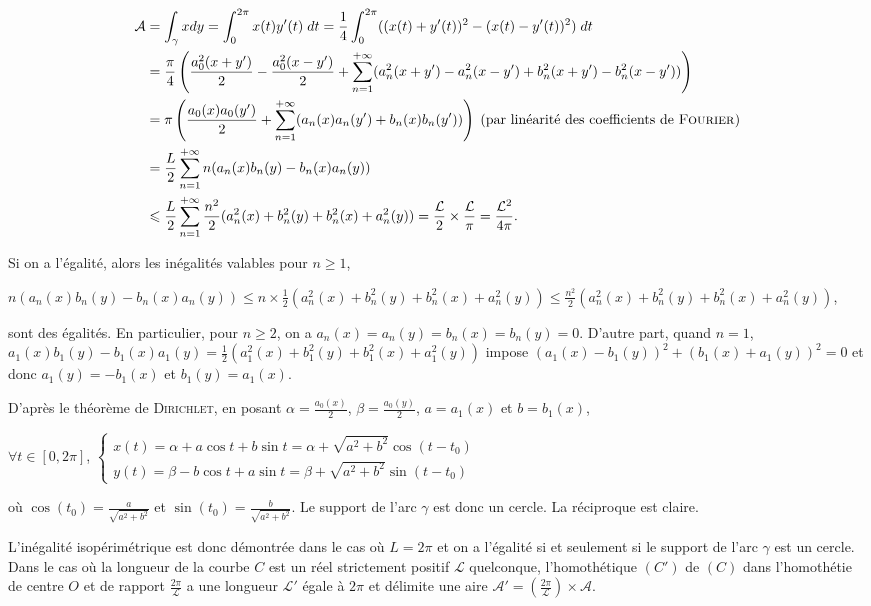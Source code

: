 {{\begin{align*}\ensuremath
\mathcal{A}&=\int_{\gamma}^{}xdy=\int_{0}^{2\pi}x(t)y'(t)\;dt= \frac{1}{4}\int_{0}^{2\pi}((x(t)+y'(t))^2-(x(t)-y'(t))^2)\;dt\\
 &= \frac{\pi}{4}\left( \frac{a_0^2(x+y')}{2}- \frac{a_0^2(x-y')}{2}+\sum_{n=1}^{+\infty}(a_n^2(x+y')-a_n^2(x-y')+b_n^2(x+y')-b_n^2(x-y'))\right)\\
 &=\pi\left( \frac{a_0(x)a_0(y')}{2}+\sum_{n=1}^{+\infty}(a_n(x)a_n(y')+b_n(x)b_n(y'))\right)\;(\text{par linéarité des coefficients de \textsc{Fourier}})\\
 &= \frac{L}{2}\sum_{n=1}^{+\infty}n(a_n(x)b_n(y)-b_n(x)a_n(y))\\
 &\leqslant \frac{L}{2}\sum_{n=1}^{+\infty} \frac{n^2}{2}(a_n^2(x)+b_n^2(y)+b_n^2(x)+a_n^2(y))= \frac{\mathcal{L}}{2}\times \frac{\mathcal{L}}{\pi}= \frac{\mathcal{L}^2}{4\pi}.
\end{align*}

Si on a l'égalité, alors les inégalités valables pour $n\geqslant1$, 

\begin{center}
$n(a_n(x)b_n(y)-b_n(x)a_n(y))\leqslant n\times \frac{1}{2}(a_n^2(x)+b_n^2(y)+b_n^2(x)+a_n^2(y))\leqslant  \frac{n^2}{2}(a_n^2(x)+b_n^2(y)+b_n^2(x)+a_n^2(y))$,
\end{center}

sont des égalités. En particulier, pour $n\geqslant2$, on a $a_n(x)=a_n(y)=b_n(x)=b_n(y)=0$. D'autre part, quand $n=1$, $a_1(x)b_1(y)-b_1(x)a_1(y)= \frac{1}{2}(a_1^2(x)+b_1^2(y)+b_1^2(x)+a_1^2(y))$ impose $(a_1(x)-b_1(y))^2+(b_1(x)+a_1(y))^2=0$ et donc $a_1(y)=-b_1(x)$ et $b_1(y)=a_1(x)$.

D'après le théorème de \textsc{Dirichlet}, en posant $\alpha= \frac{a_0(x)}{2}$, $\beta= \frac{a_0(y)}{2}$, $a=a_1(x)$ et $b=b_1(x)$,

\begin{center}
$\forall t\in[0,2\pi]$, $\left\{
\begin{array}{l}
x(t)=\alpha+a\cos t+b\sin t=\alpha+\sqrt{a^2+b^2}\cos(t-t_0)\\
y(t)=\beta-b\cos t+a\sin t=\beta+\sqrt{a^2+b^2}\sin(t-t_0)
\end{array}
\right.$
\end{center}

où $\cos(t_0)= \frac{a}{\sqrt{a^2+b^2}}$ et $\sin(t_0)= \frac{b}{\sqrt{a^2+b^2}}$. Le support de l'arc $\gamma$ est donc un cercle. La réciproque est claire.

L'inégalité isopérimétrique est donc démontrée dans le cas où $L=2\pi$ et on a l'égalité si et seulement si le support de l'arc $\gamma$ est un cercle. Dans le cas où la longueur de la courbe $C$ est un réel strictement positif $\mathcal{L}$ quelconque, l'homothétique $(C')$ de $(C)$ dans l'homothétie de centre $O$ et de rapport $ \frac{2\pi}{\mathcal{L}}$ a une longueur $\mathcal{L}'$ égale à $2\pi$ et délimite une aire $\mathcal{A}'=\left( \frac{2\pi}{\mathcal{L}}\right)\times\mathcal{A}$.

}}
